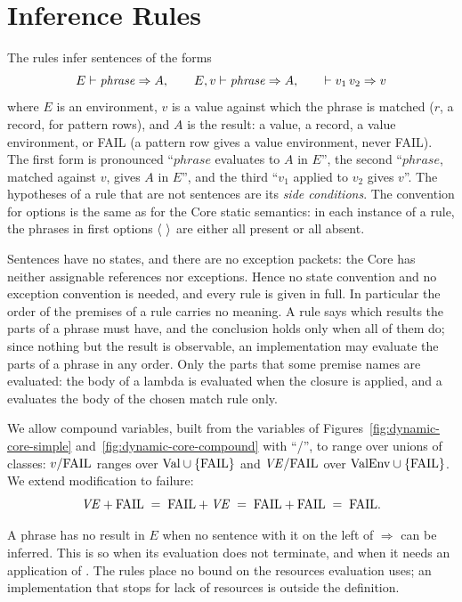\section{Inference Rules}\label{sec:dynamic-core-rules}

The rules infer sentences of the forms
\[
  E \vdash \mathit{phrase} \Rightarrow A,\qquad
  E, v \vdash \mathit{phrase} \Rightarrow A,\qquad
  \vdash v_1\,v_2 \Rightarrow v
\]
where $E$ is an environment, $v$ is a value against which the
phrase is matched ($r$, a record, for pattern rows), and $A$ is the result: a
value, a record, a value environment, or FAIL (a pattern row gives a value
environment, never FAIL). The first form is pronounced
``$\mathit{phrase}$ evaluates to $A$ in $E$'', the second
``$\mathit{phrase}$, matched against $v$, gives $A$ in $E$'', and the third
``$v_1$ applied to $v_2$ gives $v$''. The hypotheses of a rule that are not
sentences are its \emph{side conditions}. The convention for
options is the same as for the Core static semantics: in each instance of a
rule, the phrases in first options $\langle \ \rangle$ are either all present or all
absent. %

Sentences have no states, and there are no exception packets: the Core has
neither assignable references nor exceptions. Hence no state convention and
no exception convention is needed, and every rule is given in full. %
In particular the order of the premises of a rule carries no meaning. A rule
says which results the parts of a phrase must have, and the conclusion holds
only when all of them do; since nothing but the result is observable, an
implementation may evaluate the parts of a phrase in any order. %
Only the parts that some premise names are evaluated: the body of a lambda is
evaluated when the closure is applied, and a  evaluates the body of
the chosen match rule only.

We allow compound variables, built from the variables of
Figures~\ref{fig:dynamic-core-simple} and~\ref{fig:dynamic-core-compound}
with ``/'', to range over unions of classes: $v/\mathrm{FAIL}$ ranges over
$\mathrm{Val}\cup\mathrm{\{FAIL\}}$ and $\mathit{VE}/\mathrm{FAIL}$ over $\mathrm{ValEnv}\cup\mathrm{\{FAIL\}}$. We extend
modification to failure:
\[
  \mathit{VE}+\mathrm{FAIL} \;=\; \mathrm{FAIL}+\mathit{VE} \;=\; \mathrm{FAIL}+\mathrm{FAIL} \;=\; \mathrm{FAIL} .
\]

A phrase has no result in $E$ when no sentence with it on the left of
$\Rightarrow$ can be inferred. This is so when its evaluation does not
terminate, and when it needs an application of . %
The rules place no bound on the resources evaluation uses; an implementation
that stops for lack of resources is outside the definition. %

